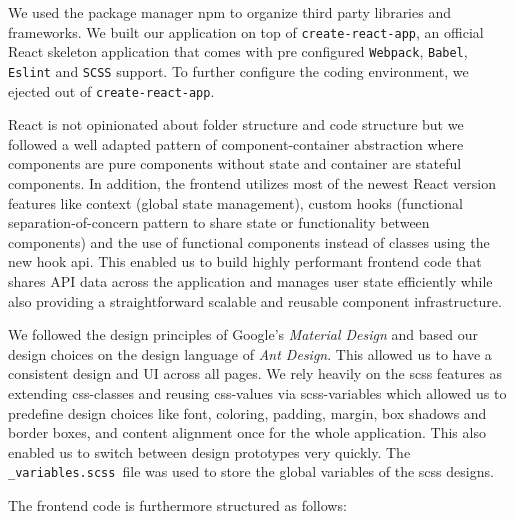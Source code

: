 We used the package manager \gls{npm} to organize third party libraries and frameworks. We built our application on top of \texttt{create-react-app}, an official React skeleton application that comes with pre configured \texttt{Webpack}, \texttt{Babel}, \texttt{Eslint} and \texttt{SCSS} support. To further configure the coding environment, we ejected out of \texttt{create-react-app}.


React is not opinionated about folder structure and code structure but we followed a well adapted pattern of component-container abstraction where components are pure components without state and container are stateful components. In addition, the frontend utilizes most of the newest React version features like context (global state management), custom hooks (functional separation-of-concern pattern to share state or functionality between components) and the use of functional components instead of classes using the new hook api. This enabled us to build highly performant frontend code that shares API data across the application and manages user state efficiently while also providing a straightforward scalable and reusable component infrastructure. 


We followed the design principles of Google’s \textit{Material Design} and based our design choices on the design language of \textit{Ant Design}. This allowed us to have a consistent design and UI across all pages. We rely heavily on the scss features as extending css-classes and reusing css-values via scss-variables which allowed us to predefine design choices like font, coloring, padding, margin, box shadows and border boxes, and content alignment once for the whole application. This also enabled us to switch between design prototypes very quickly. The \texttt{\_variables.scss }file was used to store the global variables of the scss designs. 


The frontend code is furthermore structured as follows:


